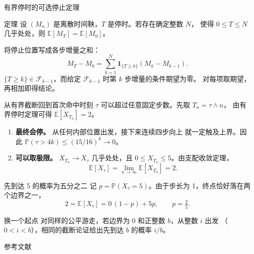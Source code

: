 \documentclass[UTF8,fontset=fandol]{ctexbeamer}
\newcommand{\E}{\mathbb{E}}
\newcommand{\Prob}{\mathbb{P}}
\newcommand{\F}{\mathcal{F}}
\begin{document}
\begin{frame}{有界停时的可选停止定理}
  \begin{block}{定理}
    设 $(M_n)$ 是离散时间鞅，$T$ 是停时。若存在确定整数 $N$，
    使得 $0\leq T\leq N$ 几乎处处，则 $\E[M_T]=\E[M_0]$。\cite{durrett}
  \end{block}
  将停止位置写成各步增量之和：
  \[
     M_T-M_0=\sum_{k=1}^{N}
       \mathbf{1}_{\{T\geq k\}}(M_k-M_{k-1}).
  \]
  $\{T\geq k\}\in\F_{k-1}$，而给定 $\F_{k-1}$ 时第 $k$ 步增量的条件期望为零。
  对每项取期望，再相加即得结论。
\end{frame}

\begin{frame}{从有界截断回到首次命中时刻}
  $\tau$ 可以超过任意固定步数。先取 $T_n=\tau\wedge n$，
  由有界停时定理可得 $\E[X_{T_n}]=2$。
  \begin{enumerate}
    \item \textbf{最终会停。} 从任何内部位置出发，接下来连续四步向上
      就一定触及上界。因此 $\Prob(\tau>4k)\leq(15/16)^k\to0$。
    \item \textbf{可以取极限。} $X_{T_n}\to X_\tau$ 几乎处处，且
      $0\leq X_{T_n}\leq5$。由支配收敛定理，
      \[
        \E[X_\tau]=\lim_{n\to\infty}\E[X_{T_n}]=2 .
      \]
  \end{enumerate}
\end{frame}

\begin{frame}{先到达 5 的概率为五分之二}
  记 $p=\Prob(X_\tau=5)$。由于步长为 1，终点恰好落在两个边界之一，
  \[
    2=\E[X_\tau]=0\,(1-p)+5p,
    \qquad \boxed{p=\tfrac{2}{5}} .
  \]
  \begin{exampleblock}{换一个起点}
    对同样的公平游走，若边界为 $0$ 和正整数 $b$，从整数 $i$ 出发
    （$0<i<b$），相同的截断论证给出先到达 $b$ 的概率 $i/b$。
  \end{exampleblock}
\end{frame}

\begin{frame}{参考文献}
  
  
\end{frame}
\end{document}
